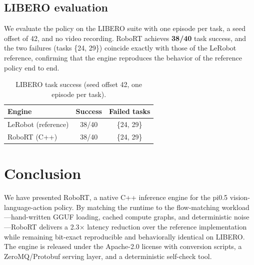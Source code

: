 \documentclass[11pt]{article}
\begin{document}
\subsection{LIBERO evaluation}
\label{sec:exp-libero}

We evaluate the policy on the LIBERO \cite{libero} suite with one episode
per task, a seed offset of 42, and no video recording. RoboRT achieves
\textbf{38/40} task success, and the two failures (tasks \{24, 29\})
coincide exactly with those of the LeRobot reference, confirming that the
engine reproduces the behavior of the reference policy end to end.

\begin{table}[t]
  \centering
  \caption{LIBERO task success (seed offset 42, one episode per task).}
  \label{tab:libero}
  \begin{tabular}{lcc}
    \toprule
    Engine & Success & Failed tasks \\
    \midrule
    LeRobot (reference) & 38/40 & \{24, 29\} \\
    RoboRT (C++)         & 38/40 & \{24, 29\} \\
    \bottomrule
  \end{tabular}
\end{table}

\section{Conclusion}
\label{sec:conclusion}

We have presented RoboRT, a native C++ inference engine for the pi0.5
vision-language-action policy. By matching the runtime to the flow-matching
workload---hand-written GGUF loading, cached compute graphs, and
deterministic noise---RoboRT delivers a 2.3$\times$ latency reduction over
the reference implementation while remaining bit-exact reproducible and
behaviorally identical on LIBERO. The engine is released under the
Apache-2.0 license with conversion scripts, a ZeroMQ/Protobuf serving layer,
and a deterministic self-check tool.
\end{document}
